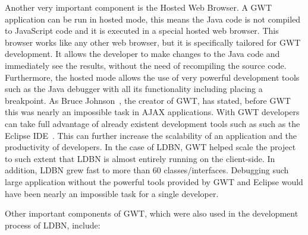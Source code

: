 Another very important component is the Hosted Web Browser. A GWT application can 
be run in hosted mode, this means 
the Java code is not compiled to JavaScript code and 
it is executed in a special hosted web browser. This browser works like any other web
browser, but it is specifically tailored for GWT development. It allows the developer
to make changes to the Java code and immediately see the results, without the need
of recompiling the source code. Furthermore, the hosted mode allows the use of 
very powerful development tools such as the Java debugger with all its functionality 
including placing a breakpoint. As Bruce Johnson~\cite{wgdd1}, 
the creator of GWT, has stated, before GWT this was nearly an impossible task in 
AJAX applications. With GWT developers can take full advantage of 
already existent development tools such as such as the Eclipse IDE~\cite{weclipse}. 
This can further increase the scalability of an application and the productivity 
of developers. 
In the case of LDBN, GWT helped scale the project to such extent that LDBN is 
almost entirely running on the client-side. In addition, LDBN grew fast to 
more than 60 classes/interfaces. Debugging such large application without the powerful 
tools provided by GWT and Eclipse would have been nearly an impossible task for 
a single developer.

Other important components of GWT, which were also used in the development 
process of LDBN, include:

